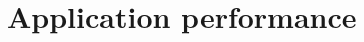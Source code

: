 \section{Application performance}
\label{sec:eval:apps}

\makeatletter
{}
\makeatother
\graphicspath{{eval/apps/figures/}}

